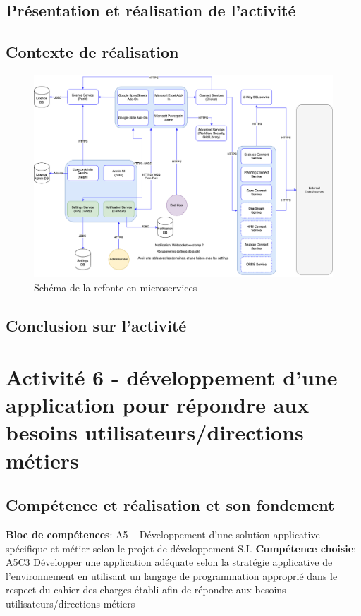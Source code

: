 \documentclass[a4paper, 11pt]{report}
\begin{document}
\subsection{Présentation et réalisation de l'activité}
\subsection{Contexte de réalisation}
  \begin{figure}[h]
      \centering
      \includegraphics[scale=0.40,center]{schemas/schema-qibates-v2.png}
      \caption{Schéma de la refonte en microservices}
  \end{figure}
\subsection{Conclusion sur l'activité}

\section{Activité 6 - développement d'une application pour répondre aux besoins utilisateurs/directions métiers}
\subsection{Compétence et réalisation et son fondement}
\textbf{Bloc de compétences}: A5 – Développement d’une solution applicative spécifique et métier selon le projet de développement S.I.
\newline
\textbf{Compétence choisie}: A5C3 Développer une application adéquate selon la stratégie applicative de l’environnement en utilisant un langage de programmation approprié dans le respect du cahier des charges établi afin de répondre aux besoins utilisateurs/directions métiers
\end{document}
